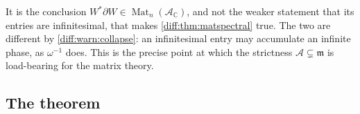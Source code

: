 \documentclass[11pt,letterpaper]{article}
\numberwithin{equation}{section}
\theoremstyle{definition}
\theoremstyle{remark}
\newcommand{\C}{\mathbb C}
\newcommand{\der}{\partial}
\newcommand{\mm}{\mathfrak m}
\newcommand{\Acl}{\mathcal A}
\newcommand{\Mat}{\operatorname{Mat}}
\begin{document}
\begin{warning}
\label{diff:warn:matboundedgauge}
It is the conclusion $W^{*}\der W\in\Mat_{n}(\Acl_{\C})$, and not the weaker
statement that its entries are infinitesimal, that makes
\cref{diff:thm:matspectral} true. The two are different by
\cref{diff:warn:collapse}: an infinitesimal entry may accumulate an infinite
phase, as $\omega^{-1}$ does. This is the precise point at which the strictness
$\Acl\subsetneq\mm$ is load-bearing for the matrix theory.
\end{warning}

\subsection{The theorem}
\label{diff:sub:matmain}
\end{document}
